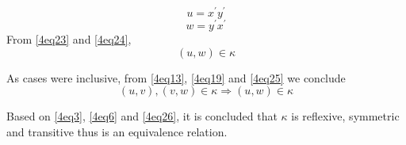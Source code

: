 \begin{itemize}
\begin{enumerate}
\begin{equation}\label{4eq23}
u = x^\prime y^\prime
\end{equation}
\begin{equation}\label{4eq24}
w = y^\prime x^\prime
\end{equation}
From \eqref{4eq23} and \eqref{4eq24},
\begin{equation}\label{4eq25}
\left( u, w \right) \in \kappa
\end{equation}
\end{enumerate}
As cases were inclusive, from \eqref{4eq13}, \eqref{4eq19} and \eqref{4eq25} we conclude
\begin{equation}\label{4eq26}
\left(u,v \right),\left(v,w\right) \in \kappa \Rightarrow \left(u,w\right) \in \kappa
\end{equation}
\end{itemize}

Based on \eqref{4eq3}, \eqref{4eq6} and \eqref{4eq26}, it is concluded that $\kappa$ is reflexive, symmetric and transitive thus is an equivalence relation.
